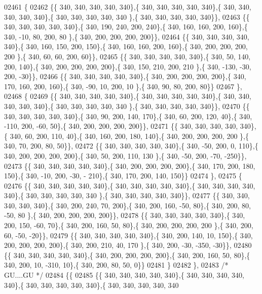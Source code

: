 \begin{DoxyCode}
02461 \{
02462 \{\{ 340, 340, 340, 340, 340\},\{ 340, 340, 340, 340, 340\},\{ 340, 340, 340, 340, 340\},\{ 340, 340, 340, 340, 340
      \},\{ 340, 340, 340, 340, 340\}\},
02463 \{\{ 340, 340, 340, 340, 340\},\{ 340, 190, 240, 200, 240\},\{ 340, 160, 160, 200, 160\},\{ 340, -10,  80, 200,  80
      \},\{ 340, 200, 200, 200, 200\}\},
02464 \{\{ 340, 340, 340, 340, 340\},\{ 340, 160, 150, 200, 150\},\{ 340, 160, 160, 200, 160\},\{ 340, 200, 200, 200, 200
      \},\{ 340,  60,  60, 200,  60\}\},
02465 \{\{ 340, 340, 340, 340, 340\},\{ 340,  50, 140, 200, 140\},\{ 340, 200, 200, 200, 200\},\{ 340, 150, 210, 200, 210
      \},\{ 340, -130, -30, 200, -30\}\},
02466 \{\{ 340, 340, 340, 340, 340\},\{ 340, 200, 200, 200, 200\},\{ 340, 170, 160, 200, 160\},\{ 340, -90,  10, 200,  10
      \},\{ 340,  90,  80, 200,  80\}\}
02467 \},
02468 \{
02469 \{\{ 340, 340, 340, 340, 340\},\{ 340, 340, 340, 340, 340\},\{ 340, 340, 340, 340, 340\},\{ 340, 340, 340, 340, 340
      \},\{ 340, 340, 340, 340, 340\}\},
02470 \{\{ 340, 340, 340, 340, 340\},\{ 340,  90, 200, 140, 170\},\{ 340,  60, 200, 120,  40\},\{ 340, -110, 200, -60,  
      50\},\{ 340, 200, 200, 200, 200\}\},
02471 \{\{ 340, 340, 340, 340, 340\},\{ 340,  60, 200, 110,  40\},\{ 340, 160, 200, 180, 140\},\{ 340, 200, 200, 200, 200
      \},\{ 340,  70, 200,  80,  50\}\},
02472 \{\{ 340, 340, 340, 340, 340\},\{ 340, -50, 200,   0, 110\},\{ 340, 200, 200, 200, 200\},\{ 340,  50, 200, 110, 130
      \},\{ 340, -50, 200, -70, -250\}\},
02473 \{\{ 340, 340, 340, 340, 340\},\{ 340, 200, 200, 200, 200\},\{ 340, 170, 200, 180, 150\},\{ 340, -10, 200, -30, -
      210\},\{ 340, 170, 200, 140, 150\}\}
02474 \},
02475 \{
02476 \{\{ 340, 340, 340, 340, 340\},\{ 340, 340, 340, 340, 340\},\{ 340, 340, 340, 340, 340\},\{ 340, 340, 340, 340, 340
      \},\{ 340, 340, 340, 340, 340\}\},
02477 \{\{ 340, 340, 340, 340, 340\},\{ 340, 200, 240,  70, 200\},\{ 340, 200, 160, -50,  80\},\{ 340, 200,  80, -50,  80
      \},\{ 340, 200, 200, 200, 200\}\},
02478 \{\{ 340, 340, 340, 340, 340\},\{ 340, 200, 150, -60,  70\},\{ 340, 200, 160,  50,  80\},\{ 340, 200, 200, 200, 200
      \},\{ 340, 200,  60, -50, -20\}\},
02479 \{\{ 340, 340, 340, 340, 340\},\{ 340, 200, 140,  10, 150\},\{ 340, 200, 200, 200, 200\},\{ 340, 200, 210,  40, 170
      \},\{ 340, 200, -30, -350, -30\}\},
02480 \{\{ 340, 340, 340, 340, 340\},\{ 340, 200, 200, 200, 200\},\{ 340, 200, 160,  50,  80\},\{ 340, 200,  10, -310,  
      10\},\{ 340, 200,  80,  50,   0\}\}
02481 \}
02482 \},
02483 \textcolor{comment}{/* GU....GU */}
02484 \{\{
02485 \{\{ 340, 340, 340, 340, 340\},\{ 340, 340, 340, 340, 340\},\{ 340, 340, 340, 340, 340\},\{ 340, 340, 340, 340, 340

\end{DoxyCode}
